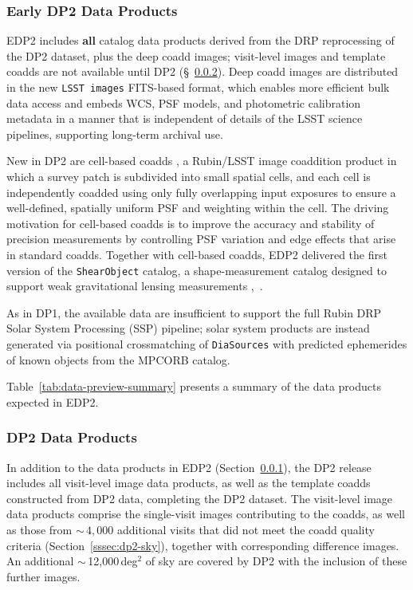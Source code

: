 \subsubsection{Early DP2 Data Products}
\label{sssec:edp2}

EDP2 includes \textbf{all} catalog data products derived from the DRP reprocessing of the DP2 dataset, plus the deep coadd images; visit-level images and template coadds are not available until DP2 (\S~\ref{sssec:dp2-full}).
Deep coadd images are distributed in the new \texttt{LSST images} FITS-based format, which enables more efficient bulk data access and embeds WCS, PSF models, and photometric calibration metadata in a manner that is independent of details of the LSST science pipelines, supporting long-term archival use.

New in DP2 are cell-based coadds \citep[][]{DMTN-015, SITCOMTN-137, SITCOMTN-162}, a Rubin/LSST image coaddition product in which a survey patch is subdivided into small spatial cells, and each cell is independently coadded using only fully overlapping input exposures to ensure a well-defined, spatially uniform PSF and weighting within the cell.
The driving motivation for cell-based coadds is to improve the accuracy and stability of precision measurements by controlling PSF variation and edge effects that arise in standard coadds.
Together with cell-based coadds, EDP2 delivered the first version of the \texttt{ShearObject} catalog, a shape-measurement catalog designed to support weak gravitational lensing measurements \dpdd{},~.

As in DP1, the available data are insufficient to support the full Rubin DRP Solar System Processing (SSP) pipeline; solar system products are instead generated via positional crossmatching of \texttt{DiaSources} with predicted ephemerides of known objects from the MPCORB catalog.

Table~\ref{tab:data-preview-summary} presents a summary of the data products expected in EDP2.

\subsubsection{DP2 Data Products}
\label{sssec:dp2-full}

In addition to the data products in EDP2 (Section~\ref{sssec:edp2}), the DP2 release includes all visit-level image data products, as well as the template coadds constructed from DP2 data, completing the DP2 dataset.
The visit-level image data products comprise the single-visit images contributing to the coadds, as well as those from $\sim\,4,000$ additional visits that did not meet the coadd quality criteria (Section~\ref{sssec:dp2-sky}), together with corresponding difference images.
An additional $\sim$\,12,000\,deg$^{2}$ of sky are covered by DP2 with the inclusion of these further images.

